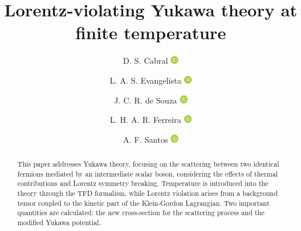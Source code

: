 \documentclass[11pt,showpacs,preprintnumbers,amsmath,amssymb,prd,nofootinbib,superscriptaddress]{revtex4-2}
\newcommand{\orcid}[1]{\href{https://orcid.org/#1}{\includegraphics[width=10pt]{orcid.png}}}
\begin{document}
\title{Lorentz-violating Yukawa theory at finite temperature}

\author{D. S. Cabral  \orcid{0000-0002-7086-5582}}

\author{L. A. S. Evangelista \orcid{0009-0002-3136-2234}}

\author{J. C. R. de Souza \orcid{0000-0002-7684-9540}}

\author{L. H. A. R. Ferreira \orcid{0000-0002-4384-2545}}

\author{A. F. Santos \orcid{0000-0002-2505-5273}}



\begin{abstract}

This paper addresses Yukawa theory, focusing on the scattering between two identical fermions mediated by an intermediate scalar boson, considering the effects of thermal contributions and Lorentz symmetry breaking. Temperature is introduced into the theory through the TFD formalism, while Lorentz violation arises from a background tensor coupled to the kinetic part of the Klein-Gordon Lagrangian. Two important quantities are calculated: the new cross-section for the scattering process and the modified Yukawa potential.

\end{abstract}


\maketitle
\end{document}
